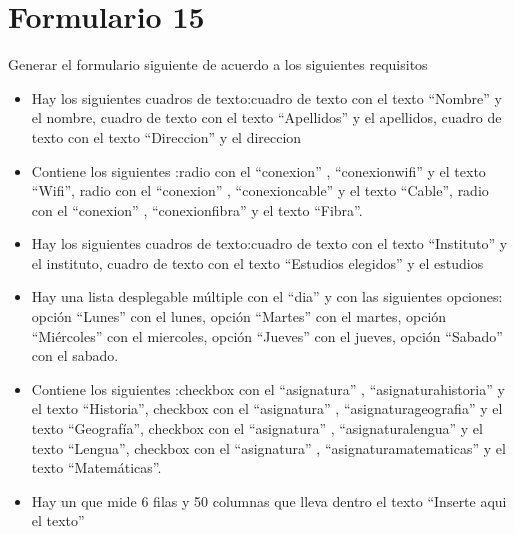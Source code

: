 \documentclass[letterpaper,10pt,spanish]{sphinxmanual}
\begin{document}
\section{Formulario 15}
\label{ejercicios/formularios/anexo_formularios:formulario-15}
Generar el formulario siguiente de acuerdo a los siguientes requisitos
\begin{itemize}
\item {} 
Hay los siguientes cuadros de texto:cuadro de texto con el texto ``Nombre'' y el  nombre, cuadro de texto con el texto ``Apellidos'' y el  apellidos, cuadro de texto con el texto ``Direccion'' y el  direccion

\item {} 
Contiene los siguientes :radio con el   ``conexion'' ,   ``conexionwifi''  y el texto ``Wifi'', radio con el   ``conexion'' ,   ``conexioncable''  y el texto ``Cable'', radio con el   ``conexion'' ,   ``conexionfibra''  y el texto ``Fibra''.

\item {} 
Hay los siguientes cuadros de texto:cuadro de texto con el texto ``Instituto'' y el  instituto, cuadro de texto con el texto ``Estudios elegidos'' y el  estudios

\item {} 
Hay una lista desplegable múltiple con el  ``dia'' y con las siguientes opciones: opción ``Lunes'' con el  lunes, opción ``Martes'' con el  martes, opción ``Miércoles'' con el  miercoles, opción ``Jueves'' con el  jueves, opción ``Sabado'' con el  sabado.

\item {} 
Contiene los siguientes :checkbox con el   ``asignatura'' ,   ``asignaturahistoria''  y el texto ``Historia'', checkbox con el   ``asignatura'' ,   ``asignaturageografia''  y el texto ``Geografía'', checkbox con el   ``asignatura'' ,   ``asignaturalengua''  y el texto ``Lengua'', checkbox con el   ``asignatura'' ,   ``asignaturamatematicas''  y el texto ``Matemáticas''.

\item {} 
Hay un  que mide 6 filas y 50 columnas que lleva dentro el texto ``Inserte aqui el texto''

\end{itemize}
\end{document}
